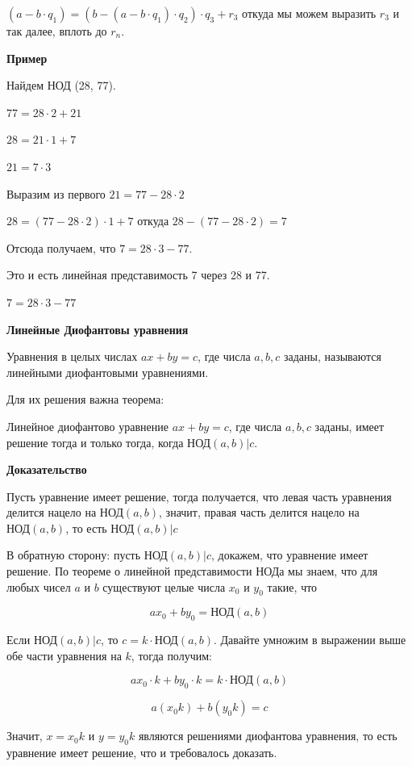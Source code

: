$(a-b\cdot q_1)=(b-(a-b\cdot q_1) \cdot q_2) \cdot q_3 + r_3$ откуда мы можем выразить $r_3$ и так далее, вплоть до $r_n$. 


{\bf Пример}

Найдем НОД (28, 77).

$77=28\cdot2 +21$

$28=21 \cdot 1 +7$

$21=7 \cdot 3$

Выразим из первого $21=77-28\cdot2$

$28=(77-28\cdot2)\cdot 1+7$ откуда $28-(77-28\cdot 2)=7$

Отсюда получаем, что $7=28\cdot 3 - 77$.

Это и есть линейная представимость 7 через 28 и 77. 

$7=28\cdot 3 - 77$

\newpage

\hspace{3mm}

\centerline{\bf \Huge Линейные Диофантовы уравнения} 

Уравнения в целых числах $ax+by = c$, где числа $a,b,c$ заданы, называются линейными диофантовыми уравнениями. 

Для их решения важна теорема:

Линейное диофантово уравнение $ax+by = c$, где числа $a,b,c$ заданы, имеет решение тогда и только тогда, когда $\text{НОД}(a,b) |c$.

{\bf Доказательство}

Пусть уравнение имеет решение, тогда получается, что левая часть уравнения делится нацело на $\text{НОД}(a,b)$, значит, правая часть делится нацело на $\text{НОД}(a,b)$, то есть $\text{НОД}(a,b) | c$

В обратную сторону: пусть $\text{НОД}(a,b) | c$, докажем, что уравнение имеет решение. По теореме о линейной представимости НОДа мы знаем, что для любых чисел $a$ и $b$ существуют целые числа $x_0$ и $y_0$ такие, что 

$$ax_0+by_0 = \text{НОД}(a,b)$$


Если $\text{НОД}(a,b)|c$, то $c = k \cdot \text{НОД}(a,b)$. Давайте умножим в выражении выше обе части уравнения на $k$, тогда получим:

$$ax_0 \cdot k + by_0\cdot k = k \cdot \text{НОД}(a,b)$$

$$a(x_0k)+b(y_0k)=c$$

Значит, $x=x_0k$ и $y=y_0k$ являются решениями диофантова уравнения, то есть уравнение имеет решение, что и требовалось доказать.


